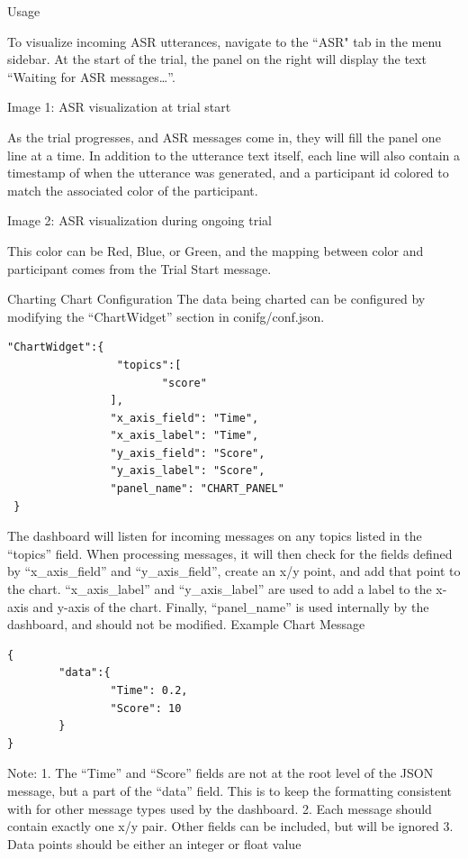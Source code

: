 Usage

To visualize incoming ASR utterances, navigate to the ``ASR" tab in the menu
sidebar. At the start of the trial, the panel on the right will display the text
``Waiting for ASR messages…''.

Image 1: ASR visualization at trial start

As the trial progresses, and ASR messages come in, they will fill the panel one
line at a time. In addition to the utterance text itself, each line will also
contain a timestamp of when the utterance was generated, and a participant id
colored to match the associated color of the participant.

Image 2: ASR visualization during ongoing trial

This color can be Red, Blue, or Green, and the mapping between color and participant comes from the Trial Start message.

Charting
Chart Configuration
The data being charted can be configured by modifying the ``ChartWidget” section in conifg/conf.json.

\begin{verbatim}
"ChartWidget":{
                 "topics":[
                        "score"
                ],
                "x_axis_field": "Time",
                "x_axis_label": "Time",
                "y_axis_field": "Score",
                "y_axis_label": "Score",
                "panel_name": "CHART_PANEL"
 }
\end{verbatim}

The dashboard will listen for incoming messages on any topics listed in the
``topics” field. When processing messages, it will then check for the fields
defined by ``x\_axis\_field'' and ``y\_axis\_field”, create an x/y point, and
add that point to the chart. ``x\_axis\_label'' and ``y\_axis\_label'' are used to
add a label to the x-axis and y-axis of the chart. Finally, ``panel\_name'' is
used internally by the dashboard, and should not be modified.  Example Chart
Message

\begin{verbatim}
{
        "data":{
                "Time": 0.2,
                "Score": 10
        }
}
\end{verbatim}



Note:
1. The ``Time” and ``Score” fields are not at the root level of the JSON message, but a part of the ``data” field. This is to keep the formatting consistent with for other message types used by the dashboard.
2. Each message should contain exactly one x/y pair. Other fields can be included, but will be ignored
3. Data points should be either an integer or float value


